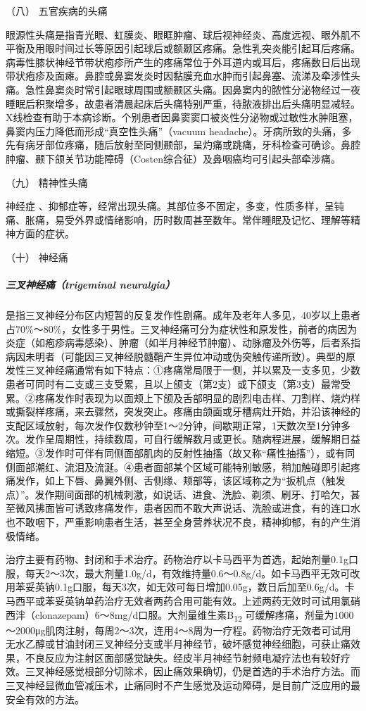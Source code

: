 \hypertarget{text00020.htmlux5cux23CHP1-7-4-8}{}
（八） 五官疾病的头痛

眼源性头痛是指青光眼、虹膜炎、眼眶肿瘤、球后视神经炎、高度远视、眼外肌不平衡及用眼时间过长等原因引起球后或额颞区疼痛。急性乳突炎能引起耳后疼痛。病毒性膝状神经节带状疱疹所产生的疼痛常位于外耳道内或耳后，疼痛数日后出现带状疱疹及面瘫。鼻腔或鼻窦发炎时因黏膜充血水肿而引起鼻塞、流涕及牵涉性头痛。急性鼻窦炎时常引起眼球周围或额颞区头痛。因鼻窦内的脓性分泌物经过一夜睡眠后积聚增多，故患者清晨起床后头痛特别严重，待脓液排出后头痛明显减轻。X线检查有助于本病诊断。个别患者因鼻窦窦口被炎性分泌物或过敏性水肿阻塞，鼻窦内压力降低而形成“真空性头痛”（vacuum
headache）。牙病所致的头痛，多先有病牙部位疼痛，随后放射至同侧颞部，呈灼痛或跳痛，牙科检查可确诊。鼻腔肿瘤、颞下颌关节功能障碍（Costen综合征）及鼻咽癌均可引起头部牵涉痛。

\hypertarget{text00020.htmlux5cux23CHP1-7-4-9}{}
（九） 精神性头痛

神经症
、抑郁症等，经常出现头痛。其部位多不固定，多变，性质多样，呈钝痛、胀痛，易受外界或情绪影响，历时数周甚至数年。常伴睡眠及记忆、理解等精神方面的症状。

\hypertarget{text00020.htmlux5cux23CHP1-7-4-10}{}
（十） 神经痛

\subparagraph{三叉神经痛（trigeminal neuralgia）}

是指三叉神经分布区内短暂的反复发作性剧痛。成年及老年人多见，40岁以上患者占70\%～80\%，女性多于男性。三叉神经痛可分为症状性和原发性，前者的病因为炎症（如疱疹病毒感染）、肿瘤（如半月神经节肿瘤）、动脉瘤及外伤等，后者系指病因未明者（可能因三叉神经脱髓鞘产生异位冲动或伪突触传递所致）。典型的原发性三叉神经痛通常有如下特点：①疼痛常局限于一侧，并以累及一支多见，少数患者可同时有二支或三支受累，且以上颌支（第2支）或下颌支（第3支）最常受累。②疼痛发作时表现为以面颊上下颌及舌部明显的剧烈电击样、刀割样、烧灼样或撕裂样疼痛，来去骤然，突发突止。疼痛由颌面或牙槽病灶开始，并沿该神经的支配区域放射，每次发作仅数秒钟至1～2分钟，间歇期正常，1天数次至1分钟多次。发作呈周期性，持续数周，可自行缓解数月或更长。随病程进展，缓解期日益缩短。③发作时可伴有同侧面部肌肉的反射性抽搐（故又称“痛性抽搐”），或有同侧面部潮红、流泪及流涎。④患者面部某个区域可能特别敏感，稍加触碰即引起疼痛发作，如上下唇、鼻翼外侧、舌侧缘、颊部等，该区域称之为“扳机点（触发点）”。发作期间面部的机械刺激，如说话、进食、洗脸、剃须、刷牙、打哈欠，甚至微风拂面皆可诱致疼痛发作，患者因而不敢大声说话、洗脸或进食，有的连口水也不敢咽下，严重影响患者生活，甚至全身营养状况不良，精神抑郁，有的产生消极情绪。

治疗主要有药物、封闭和手术治疗。药物治疗以卡马西平为首选，起始剂量0.1g口服，每天2～3次，最大剂量1.0g/d，有效维持量0.6～0.8g/d。如卡马西平无效可改用苯妥英钠0.1g口服，每天3次，如无效可每日增加0.05g，数日后加至0.6g/d。卡马西平或苯妥英钠单药治疗无效者两药合用可能有效。上述两药无效时可试用氯硝西泮（clonazepam）6～8mg/d口服。大剂量维生素B\textsubscript{12}
可缓解疼痛，剂量为1000～2000μg肌肉注射，每周2～3次，连用4～8周为一疗程。药物治疗无效者可试用无水乙醇或甘油封闭三叉神经分支或半月神经节，破坏感觉神经细胞，可获止痛效果，不良反应为注射区面部感觉缺失。经皮半月神经节射频电凝疗法也有较好疗效。三叉神经感觉根部分切除术，因止痛效果确切，仍是首选的手术治疗方法。而三叉神经显微血管减压术，止痛同时不产生感觉及运动障碍，是目前广泛应用的最安全有效的方法。


